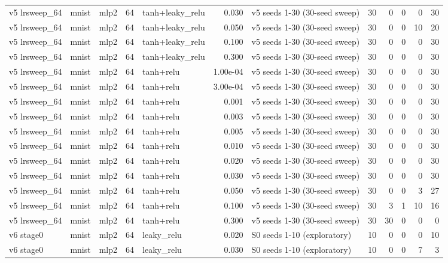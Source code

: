\begin{table}[htbp]
{\begin{tabular}{@{}lllrlrlrrrrr@{}}
v5 lrsweep\_64 & mnist & mlp2 & 64 & tanh+leaky\_relu & 0.030 & v5 seeds 1-30 (30-seed sweep) & 30 & 0 & 0 & 0 & 30 \\
v5 lrsweep\_64 & mnist & mlp2 & 64 & tanh+leaky\_relu & 0.050 & v5 seeds 1-30 (30-seed sweep) & 30 & 0 & 0 & 10 & 20 \\
v5 lrsweep\_64 & mnist & mlp2 & 64 & tanh+leaky\_relu & 0.100 & v5 seeds 1-30 (30-seed sweep) & 30 & 0 & 0 & 0 & 30 \\
v5 lrsweep\_64 & mnist & mlp2 & 64 & tanh+leaky\_relu & 0.300 & v5 seeds 1-30 (30-seed sweep) & 30 & 0 & 0 & 0 & 30 \\
v5 lrsweep\_64 & mnist & mlp2 & 64 & tanh+relu & 1.00e-04 & v5 seeds 1-30 (30-seed sweep) & 30 & 0 & 0 & 0 & 30 \\
v5 lrsweep\_64 & mnist & mlp2 & 64 & tanh+relu & 3.00e-04 & v5 seeds 1-30 (30-seed sweep) & 30 & 0 & 0 & 0 & 30 \\
v5 lrsweep\_64 & mnist & mlp2 & 64 & tanh+relu & 0.001 & v5 seeds 1-30 (30-seed sweep) & 30 & 0 & 0 & 0 & 30 \\
v5 lrsweep\_64 & mnist & mlp2 & 64 & tanh+relu & 0.003 & v5 seeds 1-30 (30-seed sweep) & 30 & 0 & 0 & 0 & 30 \\
v5 lrsweep\_64 & mnist & mlp2 & 64 & tanh+relu & 0.005 & v5 seeds 1-30 (30-seed sweep) & 30 & 0 & 0 & 0 & 30 \\
v5 lrsweep\_64 & mnist & mlp2 & 64 & tanh+relu & 0.010 & v5 seeds 1-30 (30-seed sweep) & 30 & 0 & 0 & 0 & 30 \\
v5 lrsweep\_64 & mnist & mlp2 & 64 & tanh+relu & 0.020 & v5 seeds 1-30 (30-seed sweep) & 30 & 0 & 0 & 0 & 30 \\
v5 lrsweep\_64 & mnist & mlp2 & 64 & tanh+relu & 0.030 & v5 seeds 1-30 (30-seed sweep) & 30 & 0 & 0 & 0 & 30 \\
v5 lrsweep\_64 & mnist & mlp2 & 64 & tanh+relu & 0.050 & v5 seeds 1-30 (30-seed sweep) & 30 & 0 & 0 & 3 & 27 \\
v5 lrsweep\_64 & mnist & mlp2 & 64 & tanh+relu & 0.100 & v5 seeds 1-30 (30-seed sweep) & 30 & 3 & 1 & 10 & 16 \\
v5 lrsweep\_64 & mnist & mlp2 & 64 & tanh+relu & 0.300 & v5 seeds 1-30 (30-seed sweep) & 30 & 30 & 0 & 0 & 0 \\
v6 stage0 & mnist & mlp2 & 64 & leaky\_relu & 0.020 & S0 seeds 1-10 (exploratory) & 10 & 0 & 0 & 0 & 10 \\
v6 stage0 & mnist & mlp2 & 64 & leaky\_relu & 0.030 & S0 seeds 1-10 (exploratory) & 10 & 0 & 0 & 7 & 3 \\

\end{tabular}}
\end{table}

